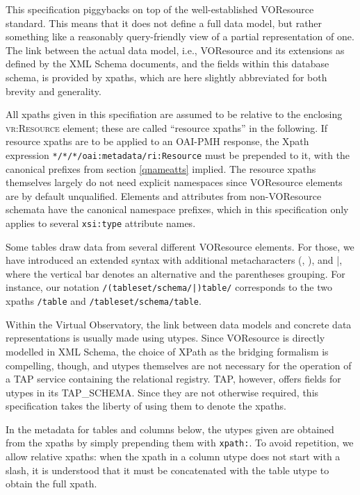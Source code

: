 \documentclass[11pt,a4paper]{ivoa}
\newcommand{\vorent}[1]{\textsc{#1}}
\begin{document}
\label{vorutypes}

This specification piggybacks on top of the well-established
VOResource standard.  This means that it does not define a full data model,
but rather something like a reasonably query-friendly view of a partial
representation of one.  The link between the actual data model, i.e.,
VOResource and its extensions as defined by the XML Schema documents, and
the fields within this database schema, is provided by
xpaths, which are here slightly abbreviated for both brevity and
generality.

All xpaths given in this specifiation are assumed to be relative to
the enclosing \vorent{vr:Resource} element; these are called
``resource xpaths'' in the following.  If resource xpaths are to be
applied to an OAI-PMH response, the Xpath expression
\texttt{*/*/*/oai:metadata/ri:Resource} must be prepended to it,
with the canonical prefixes from section \ref{qnameatts} implied.  The resource xpaths themselves
largely do not need explicit namespaces since VOResource elements are by
default unqualified.  Elements and attributes from non-VOResource
schemata have the canonical namespace prefixes, which in this
specification only applies to several \texttt{xsi:type} attribute
names.

Some tables draw data from several different VOResource elements.
For those, we have introduced an extended syntax with additional
metacharacters (, ), and |, where the vertical bar denotes an
alternative and the parentheses grouping.  For instance, our notation
\texttt{/(tableset/schema/|)table/} corresponds to the two xpaths
\texttt{/table} and \texttt{/tableset/schema/table}.

Within the Virtual Observatory, the link between data models and
concrete data representations is usually made using utypes.
Since VOResource is directly modelled
in XML Schema, the choice of XPath as the bridging formalism is 
compelling, though, and utypes themselves are not necessary for the
operation of a TAP service containing the relational registry.
TAP, however, offers fields for utypes in its TAP\_SCHEMA.  Since they
are not otherwise required, this specification takes the liberty of
using them to denote the xpaths.

In the metadata for tables and columns below, the utypes given are
obtained from the xpaths by simply prepending them with
\texttt{xpath:}.  To avoid repetition, we allow relative xpaths:
when the xpath in a column utype does not start with a slash, it is
understood that it must be concatenated with the table utype to obtain
the full xpath.
\end{document}
